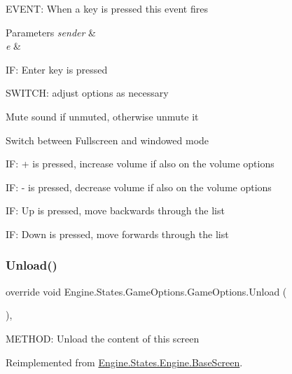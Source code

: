 E\+V\+E\+NT\+: When a key is pressed this event fires 


\begin{DoxyParams}{Parameters}
{\em sender} & \\
\hline
{\em e} & \\
\hline
\end{DoxyParams}
IF\+: Enter key is pressed

S\+W\+I\+T\+CH\+: adjust options as necessary

Mute sound if unmuted, otherwise unmute it

Switch between Fullscreen and windowed mode

IF\+: + is pressed, increase volume if also on the volume options

IF\+: -\/ is pressed, decrease volume if also on the volume options

IF\+: Up is pressed, move backwards through the list

IF\+: Down is pressed, move forwards through the list \mbox{\label{a00558_aedf1c1415b77bf7c8ce37d754039de7b}} 
\subsubsection{\texorpdfstring{Unload()}{Unload()}}
{\footnotesize\ttfamily override void Engine.\+States.\+Game\+Options.\+Game\+Options.\+Unload (\begin{DoxyParamCaption}{ }\end{DoxyParamCaption})\hspace{0.3cm}{\ttfamily [inline]}, {\ttfamily [virtual]}}



M\+E\+T\+H\+OD\+: Unload the content of this screen 



Reimplemented from \hyperlink{a00550_a861ab6364e68e3e3b6b9718e34ba18a2}{Engine.\+States.\+Engine.\+Base\+Screen}.

\mbox{\label{a00558_a629d2a00abd6bfcc21524911e74fee3a}} 
